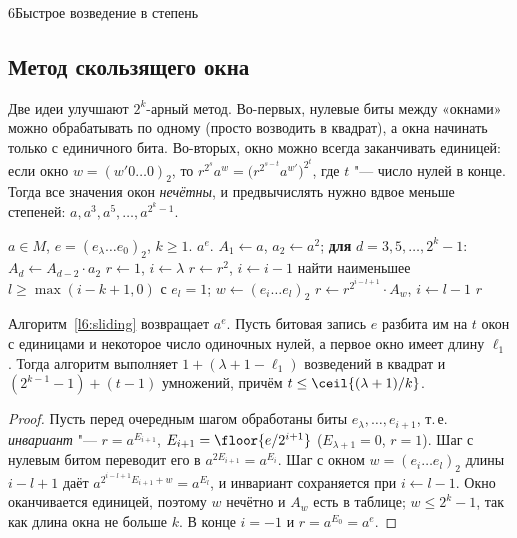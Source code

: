 \begin{lecture}{6}{Быстрое возведение в степень}

\subsection{Метод скользящего окна}\label{l6:sec-sliding}

Две идеи улучшают $2^k$-арный метод. Во-первых, нулевые биты между «окнами» можно
обрабатывать по одному (просто возводить в квадрат), а окна начинать только с единичного бита.
Во-вторых, окно можно всегда заканчивать единицей: если окно $w = (w' 0 \dots 0)_2$, то
$r^{2^s} a^w = \bigl(r^{2^{s - t}} a^{w'}\bigr)^{2^t}$, где $t$ "--- число нулей в конце.
Тогда все значения окон \emph{нечётны}, и предвычислять нужно вдвое меньше степеней:
$a, a^3, a^5, \dots, a^{2^k - 1}$.

\begin{algorithm}\label{l6:sliding}
\begin{algorithmic}[1]
\Require $a \in M$, $e = (e_\lambda \dots e_0)_2$, $k \ge 1$.
\Ensure $a^e$.
\State $A_1 \gets a$, $a_2 \gets a^2$; \textbf{для} $d = 3, 5, \dots, 2^k - 1$:
  $A_d \gets A_{d-2} \cdot a_2$ 
\State $r \gets 1$, $i \gets \lambda$
    \State $r \gets r^2$, \quad $i \gets i - 1$
  \Else
    \State найти наименьшее $l \ge \max(i - k + 1, 0)$ с $e_l = 1$; \quad $w \gets (e_i \dots e_l)_2$
    \State $r \gets r^{2^{i - l + 1}} \cdot A_w$, \quad $i \gets l - 1$
  \EndIf
\EndWhile
\State \Return $r$
\end{algorithmic}
\end{algorithm}

\begin{theorem}\label{l6:sliding-count}
Алгоритм~\ref{l6:sliding} возвращает $a^e$. Пусть битовая запись $e$ разбита им на $t$ окон
с единицами и некоторое число одиночных нулей, а первое окно имеет длину $\ell_1$. Тогда
алгоритм выполняет $1 + (\lambda + 1 - \ell_1)$ возведений в квадрат и
$(2^{k-1} - 1) + (t - 1)$ умножений, причём $t \le \ceil{(\lambda + 1)/k}$.
\end{theorem}

\begin{proof}
Пусть перед очередным шагом обработаны биты $e_\lambda, \dots, e_{i+1}$, т.\,е.
\emph{инвариант} "--- $r = a^{E_{i+1}}$, $E_{i+1} = \floor{e/2^{i+1}}$ ($E_{\lambda+1} = 0$, $r = 1$).
Шаг с нулевым битом переводит его в $a^{2E_{i+1}} = a^{E_i}$. Шаг с окном $w = (e_i \dots e_l)_2$
длины $i - l + 1$ даёт $a^{2^{i-l+1} E_{i+1} + w} = a^{E_l}$, и инвариант сохраняется
при $i \gets l - 1$. Окно оканчивается единицей, поэтому $w$ нечётно и $A_w$ есть в таблице;
$w \le 2^k - 1$, так как длина окна не больше $k$. В конце $i = -1$ и $r = a^{E_0} = a^e$.


\end{proof}
\end{lecture}
